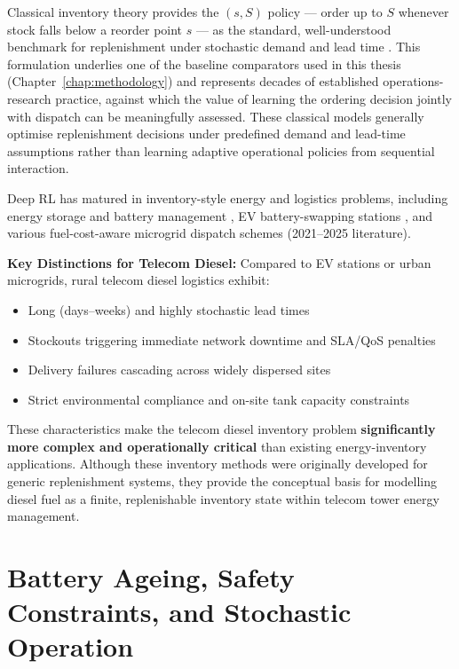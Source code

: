 Classical inventory theory provides the $(s,S)$ policy --- order up to $S$
whenever stock falls below a reorder point $s$ --- as the standard,
well-understood benchmark for replenishment under stochastic demand and
lead time \citep{silver1998inventory,zipkin2000foundations}. This
formulation underlies one of the baseline comparators used in this thesis
(Chapter~\ref{chap:methodology}) and represents decades of established
operations-research practice, against which the value of learning the
ordering decision jointly with dispatch can be meaningfully assessed.
These classical models generally optimise replenishment decisions under
predefined demand and lead-time assumptions rather than learning adaptive
operational policies from sequential interaction.

Deep RL has matured in inventory-style energy and logistics problems, including
energy storage and battery management \citep{mao2021_inventory_rl},
EV battery-swapping stations \citep{qi_2025_battery_swapping_inventory},
and various fuel-cost-aware microgrid dispatch schemes (2021--2025 literature).

\textbf{Key Distinctions for Telecom Diesel:} Compared to EV stations or urban
microgrids, rural telecom diesel logistics exhibit:
\begin{itemize}
    \item Long (days--weeks) and highly stochastic lead times
    \item Stockouts triggering immediate network downtime and SLA/QoS penalties
    \item Delivery failures cascading across widely dispersed sites
    \item Strict environmental compliance and on-site tank capacity constraints
\end{itemize}

These characteristics make the telecom diesel inventory problem
\textbf{significantly more complex and operationally critical} than
existing energy-inventory applications. Although these inventory methods
were originally developed for generic replenishment systems, they provide
the conceptual basis for modelling diesel fuel as a finite,
replenishable inventory state within telecom tower energy management.

\section{Battery Ageing, Safety Constraints, and Stochastic Operation}

